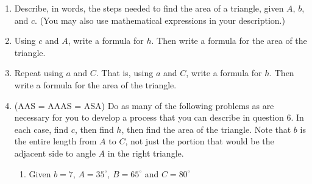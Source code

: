 \documentclass[number]{ximera}
\begin{document}
\begin{enumerate}
\begin{enumerate}
\end{enumerate}
 
\item Describe, in words, the steps needed to find the area of a triangle, given $A$, $b$, and $c$. (You may also use mathematical expressions in your description.)

\item Using $c$ and $A$, write a formula for $h$. Then write a formula for the area of the triangle. 

 
\item Repeat using $a$ and $C$. That is, using $a$ and $C$, write a formula for $h$. Then write a formula for the area of the triangle.

\newpage

\item (AAS = AAAS = ASA) Do as many of the following problems as are necessary for you to develop a process that you can describe in question 6. In each case, find $c$, then find $h$, then find the area of the triangle. Note that $b$ is the entire length from $A$ to $C$, not just the portion that would be the adjacent side to angle $A$ in the right triangle.

\begin{enumerate}

\item Given $b = 7$, $A = 35^\circ$, $B = 65^\circ$ and $C = 80^\circ$

 

\end{enumerate}
\end{enumerate}
\end{document}
